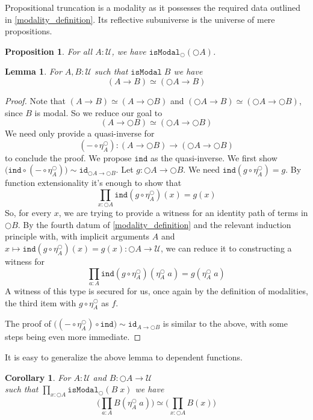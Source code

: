 \documentclass[12pt]{report}
\newtheorem{lem}[thm]{Lemma}
\newtheorem{cor}[thm]{Corollary}
\newtheorem{prop}[thm]{Proposition}
\begin{document}
Propositional truncation is a modality as it possesses the required data outlined in \ref{modality_definition}. 
Its reflective subuniverse is the universe of mere propositions.  
\begin{prop}
For all $A  :\mathcal{U}$, we have $\mathtt{isModal}_{\bigcirc}(\bigcirc A)$. 
\end{prop}
\begin{lem}
For $A, B : \mathcal{U}$ such that $\mathtt{isModal}\; B$ we have
$$(A\rightarrow B) \simeq (\bigcirc A \rightarrow B)$$
\end{lem}
\begin{proof}
Note that $(A\rightarrow B) \simeq (A\rightarrow \bigcirc B)$ and $(\bigcirc A \rightarrow B) \simeq (\bigcirc A \rightarrow \bigcirc B)$, since $B$ is modal. 
So we reduce our goal to 
$$(A\rightarrow \bigcirc B) \simeq (\bigcirc A \rightarrow \bigcirc B)$$
We need only provide a quasi-inverse for 
$$(-\circ \eta_A^{\bigcirc}) : (A\rightarrow \bigcirc B) \rightarrow (\bigcirc A \rightarrow \bigcirc B)$$
 to conclude the proof. 
We propose $\mathtt{ind}$ as the quasi-inverse. 
We first show $\big(\mathtt{ind}\circ (-\circ \eta_A^{\bigcirc})\big) \sim \mathtt{id}_{\bigcirc A \rightarrow \bigcirc B}$. 
Let $g : \bigcirc A \rightarrow \bigcirc B$. 
We need $\mathtt{ind}(g\circ \eta_A^\bigcirc ) = g$. 
By function extensionality it's enough to show that 
$$\prod_{x : \bigcirc A}\mathtt{ind}(g\circ \eta_A^\bigcirc )(x) = g(x)$$
So, for every $x$, we are trying to provide a witness for an identity path of terms in $\bigcirc B$. 
By the fourth datum of \ref{modality_definition} and the relevant induction principle with, with implicit arguments $A$ and $x\mapsto \mathtt{ind}(g\circ \eta_A^\bigcirc )(x) = g(x) : \bigcirc A \rightarrow \mathcal{U}$, we can reduce it to constructing a witness for
$$\prod_{a : A} \mathtt{ind}(g\circ \eta_A^\bigcirc )(\eta^\bigcirc_{A}\;a) = g(\eta^\bigcirc_{A}\;a)$$
A witness of this type is secured for us, once again by the definition of modalities, the third item with $g \circ \eta_A^\bigcirc $ as $f$. 

The proof of $\big( (-\circ \eta_A^{\bigcirc})\circ \mathtt{ind}\big) \sim \mathtt{id}_{A \rightarrow \bigcirc B}$ 
is similar to the above, with some steps being even more immediate. 
\end{proof}
It is easy to generalize the above lemma to dependent functions.
\begin{cor}
For $A : \mathcal{U}$ and $B : \bigcirc A \rightarrow \mathcal{U}$ \\
such that $\prod_{x : \bigcirc A}\mathtt{isModal}_\bigcirc (B\;x)$ we have
$$\Big(\prod_{a : A}B(\eta_A^\bigcirc \; a)\Big) \simeq \Big( \prod_{x : \bigcirc A}B(x) \Big)$$
\end{cor}
\end{document}
